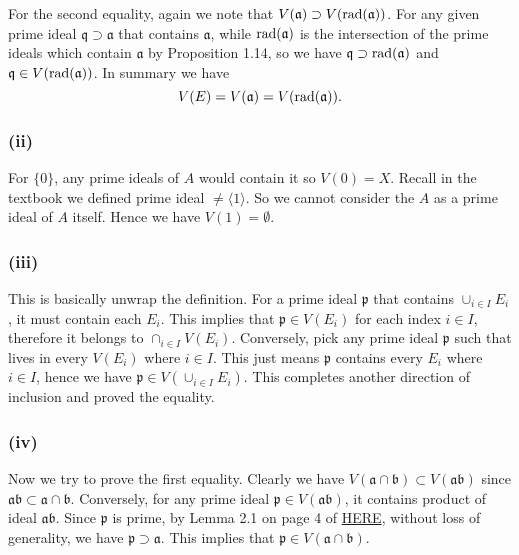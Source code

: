 \noindent For the second equality, again we note that $V(\mathfrak a)\supset V(\operatorname{rad}(\mathfrak a))$. For any given prime ideal $\mathfrak q\supset \mathfrak a$ that contains $\mathfrak a$, while $\operatorname{rad}(\mathfrak a)$ is the intersection of the prime ideals which contain $\mathfrak a$ by Proposition 1.14, so we have $\mathfrak q\supset \operatorname{rad}(\mathfrak a)$ and $\mathfrak q\in V(\operatorname{rad}(\mathfrak a))$. In summary we have 
$$V(E)=V(\mathfrak a)=V(\operatorname{rad}(\mathfrak a)).$$

\subsubsection{(ii)} For $\{0\}$, any prime ideals of $A$ would contain it so $V(0)=X$. Recall in the textbook we defined prime ideal $\neq \langle 1\rangle$. So we cannot consider the $A$ as a prime ideal of $A$ itself. Hence we have $V(1)=\emptyset$.\\

\subsubsection{(iii)} This is basically unwrap the definition. For a prime ideal $\mathfrak p$ that contains $\cup_{i\in I} E_i$, it must contain each $E_i$. This implies that $\mathfrak p\in V(E_i)$ for each index $i\in I$, therefore it belongs to $\cap _{i\in I} V(E_i)$. Conversely, pick any prime ideal $\mathfrak p$ such that lives in every $V(E_i)$ where $i\in I$. This just means $\mathfrak p$ contains every $E_i$ where $i\in I$, hence we have $\mathfrak p\in V(\cup_{i\in I} E_i)$. This completes another direction of inclusion and proved the equality.\\

\subsubsection{(iv)} Now we try to prove the first equality. Clearly we have $V(\mathfrak a \cap \mathfrak b)\subset V(\mathfrak a\mathfrak b)$ since $\mathfrak a\mathfrak b\subset \mathfrak a\cap \mathfrak b$. Conversely, for any prime ideal $\mathfrak p\in V(\mathfrak a\mathfrak b)$, it contains product of ideal $\mathfrak a\mathfrak b$. Since $\mathfrak p$ is prime, by Lemma 2.1 on page 4 of \href{https://www.jmilne.org/math/xnotes/CA.pdf}{HERE}, without loss of generality, we have $\mathfrak p\supset \mathfrak a$. This implies that $\mathfrak p\in V(\mathfrak a\cap\mathfrak b)$.\\

